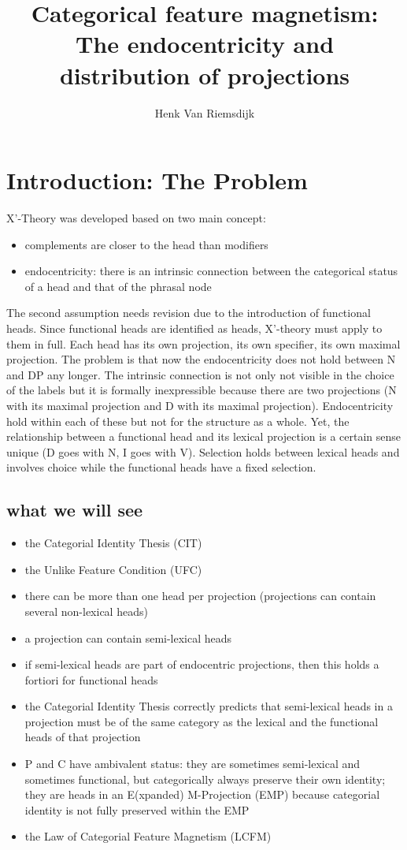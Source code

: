 \documentclass{article}
\author{Henk Van Riemsdijk}
\title {Categorical feature magnetism: The endocentricity and distribution of projections}
\begin{document}
\maketitle

\singlespace

\section{Introduction: The Problem}

X'-Theory was developed based on two main concept:
\begin{itemize}
\item complements are closer to the head than modifiers
\item endocentricity: there is an intrinsic connection between the categorical status of a head and that of the phrasal node
\end{itemize}

The second assumption needs revision due to the introduction of functional heads. Since functional heads are identified as heads, X'-theory must apply to them in full. Each head has its own projection, its own specifier, its own maximal projection. The problem is that now the endocentricity does not hold between N and DP any longer. The intrinsic connection is not only not visible in the choice of the labels but it is formally inexpressible because there are two projections (N with its maximal projection and D with its maximal projection). Endocentricity hold within each of these but not for the structure as a whole. Yet, the relationship between a functional head and its lexical projection is a certain sense unique (D goes with N, I goes with V). Selection holds between lexical heads and involves choice while the functional heads have a fixed selection. 
\subsection{what we will see}
\begin{itemize}
\item the Categorial Identity Thesis (CIT)
\item the Unlike Feature Condition (UFC) 
\item there can be more than one head per projection (projections can contain several non-lexical heads)
\item a projection can contain semi-lexical heads
\item if semi-lexical heads are part of endocentric projections, then this holds a fortiori for functional heads
\item the Categorial Identity Thesis correctly predicts that semi-lexical heads in a projection must be of the same category as the lexical and the functional heads of that projection 
\item P and C have ambivalent status: they are sometimes semi-lexical and sometimes functional, but categorically always preserve their own identity; they are heads in an E(xpanded) M-Projection (EMP) because categorial identity is not fully preserved within the EMP
\item the Law of Categorial Feature Magnetism (LCFM)
\end{itemize}
\end{document}
